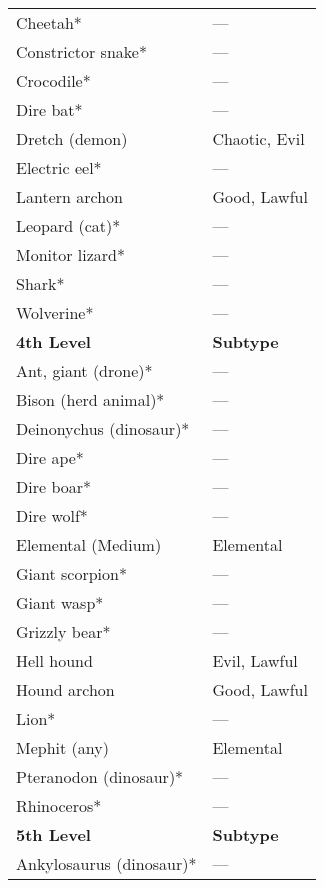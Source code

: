 \begin{tabular}{ll}
Cheetah*                  & ---                \\
Constrictor snake*        & ---                \\
Crocodile*                & ---                \\
Dire bat*                 & ---                \\
Dretch (demon)            & Chaotic, Evil    \\
Electric eel*             & ---                \\
Lantern archon            & Good, Lawful     \\
Leopard (cat)*            & ---                \\
Monitor lizard*           & ---                \\
Shark*                    & ---                \\
Wolverine*                & ---                \\
\textbf{4th Level}        & \textbf{Subtype} \\
Ant, giant (drone)*       & ---                \\
Bison (herd animal)*      & ---                \\
Deinonychus (dinosaur)*   & ---                \\
Dire ape*                 & ---                \\
Dire boar*                & ---                \\
Dire wolf*                & ---                \\
Elemental (Medium)        & Elemental        \\
Giant scorpion*           & ---                \\
Giant wasp*               & ---                \\
Grizzly bear*             & ---                \\
Hell hound                & Evil, Lawful     \\
Hound archon              & Good, Lawful     \\
Lion*                     & ---                \\
Mephit (any)              & Elemental        \\
Pteranodon (dinosaur)*    & ---                \\
Rhinoceros*               & ---                \\
\textbf{5th Level}        & \textbf{Subtype} \\
Ankylosaurus (dinosaur)*  & ---                \\

\end{tabular}
